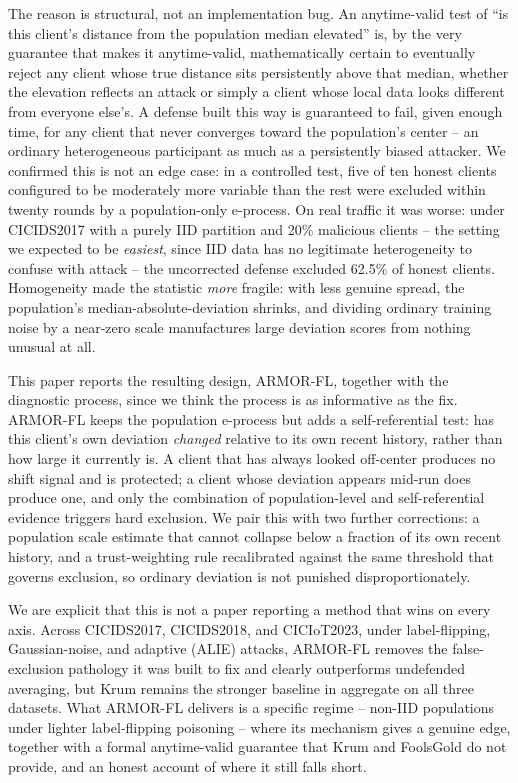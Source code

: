\documentclass[pdflatex,iicol,sn-mathphys-num]{sn-jnl}%
\theoremstyle{thmstyleone}%
\theoremstyle{thmstyletwo}%
\theoremstyle{thmstylethree}%
\begin{document}
The reason is structural, not an implementation bug. An anytime-valid test of ``is this client's distance from the population median elevated'' is, by the very guarantee that makes it anytime-valid, mathematically certain to eventually reject any client whose true distance sits persistently above that median, whether the elevation reflects an attack or simply a client whose local data looks different from everyone else's. A defense built this way is guaranteed to fail, given enough time, for any client that never converges toward the population's center -- an ordinary heterogeneous participant as much as a persistently biased attacker. We confirmed this is not an edge case: in a controlled test, five of ten honest clients configured to be moderately more variable than the rest were excluded within twenty rounds by a population-only e-process. On real traffic it was worse: under CICIDS2017 with a purely IID partition and 20\% malicious clients -- the setting we expected to be \emph{easiest}, since IID data has no legitimate heterogeneity to confuse with attack -- the uncorrected defense excluded 62.5\% of honest clients. Homogeneity made the statistic \emph{more} fragile: with less genuine spread, the population's median-absolute-deviation shrinks, and dividing ordinary training noise by a near-zero scale manufactures large deviation scores from nothing unusual at all.

This paper reports the resulting design, ARMOR-FL, together with the diagnostic process, since we think the process is as informative as the fix. ARMOR-FL keeps the population e-process but adds a self-referential test: has this client's own deviation \emph{changed} relative to its own recent history, rather than how large it currently is. A client that has always looked off-center produces no shift signal and is protected; a client whose deviation appears mid-run does produce one, and only the combination of population-level and self-referential evidence triggers hard exclusion. We pair this with two further corrections: a population scale estimate that cannot collapse below a fraction of its own recent history, and a trust-weighting rule recalibrated against the same threshold that governs exclusion, so ordinary deviation is not punished disproportionately.

We are explicit that this is not a paper reporting a method that wins on every axis. Across CICIDS2017, CICIDS2018, and CICIoT2023, under label-flipping, Gaussian-noise, and adaptive (ALIE) attacks, ARMOR-FL removes the false-exclusion pathology it was built to fix and clearly outperforms undefended averaging, but Krum remains the stronger baseline in aggregate on all three datasets. What ARMOR-FL delivers is a specific regime -- non-IID populations under lighter label-flipping poisoning -- where its mechanism gives a genuine edge, together with a formal anytime-valid guarantee that Krum and FoolsGold do not provide, and an honest account of where it still falls short.
\end{document}
